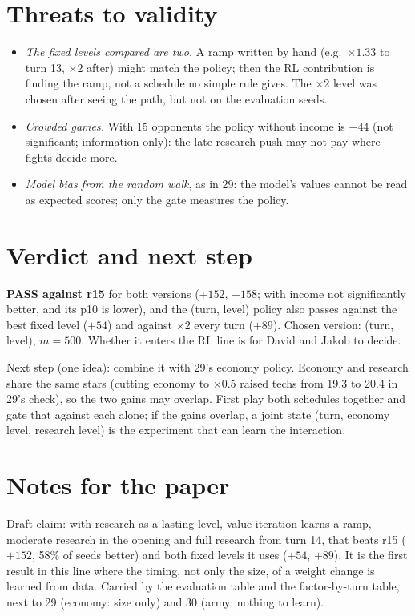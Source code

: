 \documentclass{../polyexp}
\begin{document}
\section{Threats to validity}
\begin{itemize}
  \item \emph{The fixed levels compared are two.} A ramp written by hand (e.g.\ $\times1.33$ to turn 13, $\times2$
        after) might match the policy; then the RL contribution is finding the ramp, not a schedule no simple rule
        gives. The $\times2$ level was chosen after seeing the path, but not on the evaluation seeds.
  \item \emph{Crowded games.} With 15 opponents the policy without income is $-44$ (not significant; information
        only): the late research push may not pay where fights decide more.
  \item \emph{Model bias from the random walk}, as in 29: the model's values cannot be read as expected scores; only
        the gate measures the policy.
\end{itemize}

\section{Verdict and next step}
\textbf{PASS against r15} for both versions ($+152$, $+158$; with income not significantly better, and its p10 is
lower), and the (turn, level) policy also passes against the best fixed level ($+54$) and against $\times2$ every turn
($+89$). Chosen version: (turn, level), $m = 500$. Whether it enters the RL line is for David and Jakob to decide.

Next step (one idea): combine it with 29's economy policy. Economy and research share the same stars (cutting
economy to $\times0.5$ raised techs from 19.3 to 20.4 in 29's check), so the two gains may overlap. First play both
schedules together and gate that against each alone; if the gains overlap, a joint state (turn, economy level,
research level) is the experiment that can learn the interaction.

\section{Notes for the paper}
Draft claim: with research as a lasting level, value iteration learns a ramp, moderate research in the opening and
full research from turn 14, that beats r15 ($+152$, 58\% of seeds better) and both fixed levels it uses ($+54$,
$+89$). It is the first result in this line where the timing, not only the size, of a weight change is learned
from data. Carried by the evaluation table and the factor-by-turn table, next to 29 (economy: size only) and 30
(army: nothing to learn).
\end{document}

